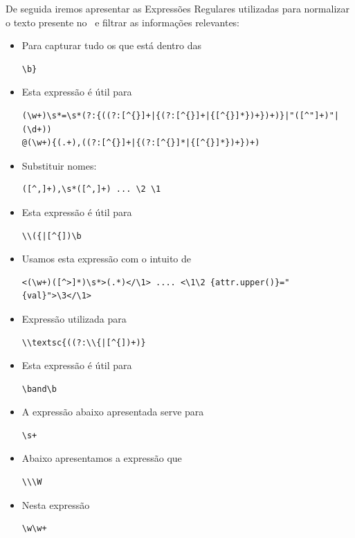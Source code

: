 \documentclass[11pt,a4paper]{report}
\begin{document}
De seguida iremos apresentar as Expressões Regulares utilizadas para normalizar o texto presente no \bib\ e filtrar as informações relevantes:
\begin{itemize}
\item Para capturar tudo os que está dentro das 
\begin{lstlisting}
\b}
\end{lstlisting}
\item Esta expressão é útil para
\begin{lstlisting}
(\w+)\s*=\s*(?:{((?:[^{}]+|{(?:[^{}]+|{[^{}]*})+})+)}|"([^"]+)"|(\d+))
@(\w+){(.+),((?:[^{}]+|{(?:[^{}]*|{[^{}]*})+})+)
\end{lstlisting}
\item Substituir nomes:
\begin{lstlisting}
([^,]+),\s*([^,]+) ... \2 \1
\end{lstlisting}
\item Esta expressão é útil para
\begin{lstlisting}
\\({|[^{])\b
\end{lstlisting}
\item Usamos esta expressão com o intuito de 
\begin{lstlisting}
<(\w+)([^>]*)\s*>(.*)</\1> .... <\1\2 {attr.upper()}="{val}">\3</\1>
\end{lstlisting}
\item Expressão utilizada para
\begin{lstlisting}
\\textsc{((?:\\{|[^{])+)}
\end{lstlisting}
\item Esta expressão é útil para
\begin{lstlisting}
\band\b
\end{lstlisting}
\item A expressão abaixo apresentada serve para 
\begin{lstlisting}
\s+
\end{lstlisting}
\item Abaixo apresentamos a expressão que 
\begin{lstlisting}
\\\W
\end{lstlisting}
\item Nesta expressão
\begin{lstlisting}
\w\w+
\end{lstlisting}
\end{itemize}
\end{document}
